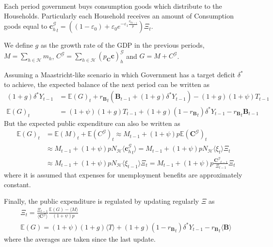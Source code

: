 \documentclass[a4paper, headings=standardclasses]{scrartcl}
\begin{document}
Each period government buys consumption goods which distribute to the Households. Particularly each Household receives an amount of Consumption goods equal to ${\mathbf{c}^\mathcal{G}_h}_t = ((1 - \varepsilon_0) + \varepsilon_0 e^{-\varepsilon_1\frac{{v_h}_{t-1}}{p}})\Xi_t$.

We define $g$ as the growth rate of the GDP %
in the previous periods, $M = \sum_{h \in \mathcal{H}} m_h$, $C^\mathcal{G}= \sum_{h \in \mathcal{H}} (p_\mathbf{C} \mathbf{c})^\mathcal{G}_h$ and $G = M + C^\mathcal{G}$.

Assuming a Maastricht-like scenario in which Government has a target deficit $\delta^*$ to achieve, the expected balance of the next period can be written as
\begin{align*}
    (1+g) \delta^* Y_{t-1} & =  {\mathbb{E}(G)}_t + {r_\mathbf{B}}_t ({\mathbf{B}}_{t-1} + (1+g) \delta^* Y_{t-1}) - (1+g)(1+\psi) T_{t-1} \\
    \mathbb{E}(G)_t        & = (1+\psi)(1+g) T_{t-1} + (1+g)(1-{r_\mathbf{B}}_t)\delta^* Y_{t-1} - {r_\mathbf{B}}_t {\mathbf{B}}_{t-1}
\end{align*}
But the expected public expenditure can also be written as
\begin{align*}
    \mathbb{E}(G)_t & = \mathbb{E}(M)_t + \mathbb{E}(C^\mathcal{G})_t \approx M_{t-1} + (1+\psi)p\mathbb{E}(\mathbf{C}^\mathcal{G})_t                                          \\
                    & \approx M_{t-1} + (1+\psi) p N_\mathcal{H} \langle {\mathbf{c}^\mathcal{G}_h}_t \rangle = M_{t-1} + (1+\psi) p N_\mathcal{H} \langle \xi_t \rangle \Xi_t \\
                    & \approx M_{t-1} + (1+\psi) p N_\mathcal{H} \langle \xi_{t-1} \rangle \Xi_t = M_{t-1} + (1+\psi) p \frac{{\mathbf{C}^\mathcal{G}}_{t-1}}{\Xi_{t-1}} \Xi_t
\end{align*}
where it is assumed that expenses for unemployment benefits are approximately constant.

Finally, the public expenditure is regulated by updating regularly $\Xi$ as
\begin{gather*}
    \Xi_t          = \frac{\Xi_{t-1}}{\langle {\mathbf{C}^\mathcal{G}} \rangle} \frac{\mathbb{E}(G) - \langle M \rangle}{(1+\psi)p}                                                                                       \\
    \mathbb{E}(G)  = (1+\psi)(1+g) \langle T \rangle + (1+g)(1-{r_\mathbf{B}}_t)\delta^* Y_{t-1} - {r_\mathbf{B}}_t \langle{\mathbf{B}}\rangle
\end{gather*}
where the averages are taken since the last update.
\end{document}
